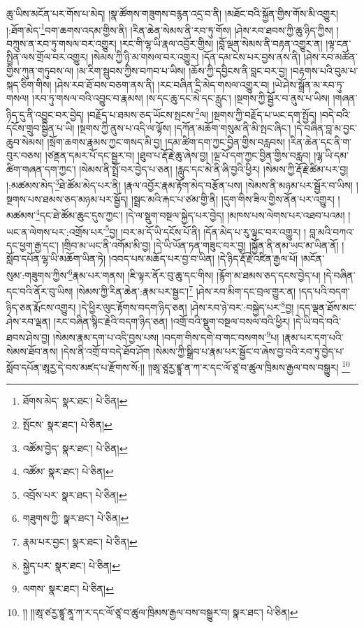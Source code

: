 ཆུ་ཡིས་མངོན་པར་གོས་པ་མེད། །སྣ་ཚོགས་གཟུགས་བརྙན་འདྲ་བ་ནི། །མཐོང་བའི་སྐྱོན་གྱིས་གོས་མི་འགྱུར། །:ཐོག་མེད་\footnote{ཐོགས་མེད་  སྣར་ཐང་།  པེ་ཅིན། }བག་ཆགས་འདམ་གྱིས་ནི། །རིན་ཆེན་སེམས་ནི་རབ་ཏུ་གོས། །ཤེས་རབ་ཐབས་ཀྱི་ཆུ་ཉིད་ཀྱིས། །བཀྲུས་ན་རབ་ཏུ་གསལ་བར་འགྱུར། །རང་གི་ལྷ་ཡི་རྣལ་འབྱོར་གྱིས། །བློ་ལྡན་སེམས་ནི་བརྟན་འགྱུར་ན། །ལྟ་ངན་སྤྲིན་ལས་གྲོལ་བར་འགྱུར། །སེམས་ཀྱི་ཉི་མ་གསལ་བར་འགྱུར། །དོན་དམ་ངེས་པར་བྱས་ནས་ནི། །ཤེས་རབ་མཚོན་གྱིས་ཀུན་གཏུབས་ལ། །མ་རིག་སྦུབས་ཀྱིས་བཀབ་པ་ཡིས། །ཆོས་ཀྱི་དབྱིངས་ནི་བླང་བར་བྱ། །བརྟགས་པའི་བུམ་པ་སྐད་ཅིག་གིས། །ཤེས་རབ་ཐོ་བས་བཅག་ནས་ནི། །རང་བཞིན་དྲི་མེད་གསལ་འགྱུར་བ། །ཡེ་ཤེས་སྒྲོན་མ་རབ་ཏུ་གསལ། །རབ་ཏུ་གསལ་བའི་འབྱུང་བ་རྣམས། །ས་དང་ཆུ་དང་མེ་དང་རླུང་། །སྔགས་ཀྱི་སྦྱོར་བ་ནུས་པ་ཡིས། །གཞན་ཉིད་དུ་ནི་འབྱུང་བར་བྱེད། །བརྗོད་པ་ཐམས་ཅད་ཡོངས་སྤངས་\footnote{སྤོངས་  སྣར་ཐང་།  པེ་ཅིན། }ལ། །སྔགས་ཀྱི་བརྗོད་པ་ཡང་དག་སྤྱོད། །བདེ་བའི་དངོས་གྲུབ་སྦྱིན་པ་ཡི། །སྔགས་ཀྱི་ནུས་པ་འདི་ལ་ལྟོས། །དཀོན་མཆོག་གསུམ་ནི་མི་སྤང་ཞིང་། །དེ་བཞིན་བླ་མ་བྱང་ཆུབ་སེམས། །སྲོག་ཆགས་རྣམས་ཀྱང་གསད་མི་བྱ། །དམ་ཚིག་དག་ཀྱང་བྱིན་གྱིས་བརླབས། །རིན་ཆེན་དང་ནི་ག་བུར་བཅས། །ཙནྡན་དམར་པོ་དང་སྦྱར་བ། །ཐུབ་པ་རྡོ་རྗེ་ཆུ་ཞེས་བྱ། །ལྔ་པོ་དག་ཀྱང་བྱིན་གྱིས་བརླབ། །ལྷ་ཡི་དམ་ཚིག་གཞན་དག་ཀྱང་། །སེམས་ནི་སྤྲོ་བར་བྱེད་པ་ཅན། །རླུང་དང་མེ་ནི་ཞི་བྱའི་ཕྱིར། །སེམས་ཀྱི་རྡོ་རྗེ་ཚིམ་པར་བྱ། །:མཚམས་མེད་\footnote{འཚོམ་བྱེད་  སྣར་ཐང་།  པེ་ཅིན། }ཐེ་ཚོམ་མེད་པར་ནི། །རྣལ་འབྱོར་རྣམ་རྟོག་མེད་བརྩོན་པས། །སེམས་ནི་མཉམ་པར་སྦྱོར་བ་ཡིས། །སྔགས་པས་ཐམས་ཅད་མཉམ་པར་སྦྱོད། །སྦྲང་མའི་རྐང་པ་ཙམ་གྱི་ནི། །དུག་གིས་ཟིལ་གྱིས་ནོན་པར་འགྱུར། །མཚམས་\footnote{འཚོམ་  སྣར་ཐང་།  པེ་ཅིན། }དང་ཐེ་ཚོམ་ཆུང་དུས་ཀྱང་། །དེ་ལ་སྡུག་བསྔལ་སྐྱེད་པར་བྱེད། །མཁས་པས་ལེགས་པར་འཐབ་པའམ། །ཡང་ན་ལེགས་པར་:འགྲོས་པར་\footnote{འབྲོས་པར་  སྣར་ཐང་།  པེ་ཅིན། }བྱ། །བར་མ་དོ་ཡི་དངོས་པོ་ནི། །དོན་མེད་པ་རུ་ལྟུང་བར་འགྱུར། །
བླ་མའི་བཀའ་དང་ཕྱག་རྒྱ་དང་། །གྲིབ་མ་ཡང་ནི་འགོམ་མི་བྱ། །དེ་ཡི་ཡོན་ཏན་གཟུང་བར་བྱ། །སྐྱོན་ནི་ནམ་ཡང་མ་ཡིན་ནོ། །སློབ་དཔོན་ལྷ་ཡི་མཆོག་ཡིན་ཏེ། །འབད་པས་མཆོད་པར་བྱ་བ་ཡིན། །དེ་ཉིད་རྡོ་རྗེ་འཛིན་རྒྱལ་པོ། །མངོན་སུམ་:གཟུགས་ཀྱིས་\footnote{གཟུགས་ཀྱི་  སྣར་ཐང་།  པེ་ཅིན། }རྣམ་པར་གནས། །ཇི་ལྟར་ནོར་བུ་ཆུ་དང་གིས། །རྙོག་མ་ཐམས་ཅད་དངས་བྱེད་པ། །དེ་བཞིན་དང་བའི་ནོར་བུ་ཡིས། །སེམས་ཀྱི་རིན་ཆེན་:རྣམ་པར་སྦྱང་།\footnote{རྣམ་པར་བྱང་།  སྣར་ཐང་།  པེ་ཅིན། } །ཤེས་རབ་མིག་དང་བྲལ་གྱུར་ན། །དད་པའི་བདག་ཉིད་ཅན་རྨོངས་འགྱུར། །དེ་ཕྱིར་ལུང་རྟོགས་བདག་ཉིད་ཅན། །ཤེས་རབ་ཉེ་བར་:བསྐྱེད་པར་\footnote{སྐྱེད་པར་  སྣར་ཐང་།  པེ་ཅིན། }བྱ། །དད་ལྡན་ཐོས་མང་ཤེས་རབ་ལྡན། །རང་བཞིན་སྙིང་རྗེའི་བདག་ཉིད་ཅན། །འགྲོ་བའི་སྡུག་བསྔལ་བསལ་བའི་ཕྱིར། །དེ་ཡི་བདེ་བའི་ཐབས་ཤེས་བྱ། །སེམས་རྣམ་དག་པ་འདི་བྱས་པས། །བདག་གིས་དགེ་བ་གང་བསགས་\footnote{ལགས་  སྣར་ཐང་།  པེ་ཅིན། }པ། །རྣམ་པར་དག་པའི་སེམས་ཐོབ་ནས། །དེས་ནི་འགྲོ་བ་བདེ་ཐོབ་ཤོག །སེམས་ཀྱི་སྒྲིབ་པ་རྣམ་པར་སྦྱོང་བ་ཞེས་བྱ་བའི་རབ་ཏུ་བྱེད་པ་སློབ་དཔོན་ཨཱརྱ་དེ་བས་མཛད་པ་རྫོགས་སོ:།། །།ཨཱ་ཙཱརྱ་ཛྙཱ་ན་ཀ་ར་དང་ལོ་ཙཱ་བ་ཚུལ་ཁྲིམས་རྒྱལ་བས་བསྒྱུར། \footnote{།། །།ཨཱ་ཙརྱ་ཛྙཱ་ནཱ་ཀ་ར་དང་ལོ་ཙཱ་བ་ཚུལ་ཁྲིམས་རྒྱལ་བས་བསྒྱུར་བ།   སྣར་ཐང་།  པེ་ཅིན། }